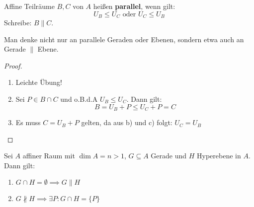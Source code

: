 \documentclass[parskip,a4paper,twoside,DIV15,BCOR12mm]{scrbook}
\begin{document}
\begin{definition}
Affine Teilräume $B,C$ von $A$ heißen \textbf{parallel}, wenn gilt:
\[U_B\le U_C \text{ oder }U_C\le U_B\]
Schreibe: $B\parallel C$.
\end{definition}

\begin{example}
Man denke nicht nur an parallele Geraden oder Ebenen, sondern etwa auch an Gerade $\parallel$ Ebene.
\end{example}

\begin{comment}
\begin{enumerate}
\item Auf den Teilräumen einer festen Dimension ist Parallelität eine Äquivalenzrelation.
\item Aus $B\parallel C$ folgt: $(B\subseteq C) \vee (B\supseteq C) \vee (B\cap C=\emptyset)$
\item Für alle $P\in A$ und alle affinen Teilräume $B\ne\emptyset$ existiert genau ein affiner Teilraum
$C$ mit:
\begin{enumerate}[(a)]
\item $P\in C$
\item $B\parallel C$
\item $\dim{C}=\dim{B}$
\end{enumerate}
\end{enumerate}
\end{comment}

\begin{proof}
\begin{enumerate}
\item Leichte Übung!
\item Sei $P\in B\cap C$ und o.B.d.A $U_B\le U_C$. Dann gilt:
\[B=U_B+P\le U_C+P=C\]
\item Es muss $C=U_B+P$ gelten, da aus b) und c) folgt: $U_C=U_B$
\end{enumerate}
\end{proof}

\begin{theo}
\label{Satz 20.3}
Sei $A$ affiner Raum mit $\dim{A}=n>1$, $G\subseteq A$ Gerade und $H$ Hyperebene in $A$.\\
Dann gilt:
\begin{enumerate}
\item $G\cap H=\emptyset \implies G\parallel H$
\item $G\not\parallel H \implies \exists P: G\cap H=\{P\}$
\end{enumerate}
\end{theo}
\end{document}
